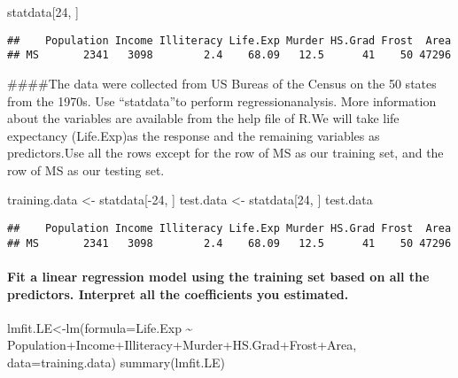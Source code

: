 \documentclass[
]{article}
\newenvironment{Shaded}{\begin{snugshade}}{\end{snugshade}}
\newcommand{\AttributeTok}[1]{\textcolor[rgb]{0.77,0.63,0.00}{#1}}
\newcommand{\DecValTok}[1]{\textcolor[rgb]{0.00,0.00,0.81}{#1}}
\newcommand{\FunctionTok}[1]{\textcolor[rgb]{0.00,0.00,0.00}{#1}}
\newcommand{\NormalTok}[1]{#1}
\newcommand{\OtherTok}[1]{\textcolor[rgb]{0.56,0.35,0.01}{#1}}
\newcommand{\SpecialCharTok}[1]{\textcolor[rgb]{0.00,0.00,0.00}{#1}}
\begin{document}
\begin{Shaded}
\begin{Highlighting}[]
\NormalTok{statdata[}\DecValTok{24}\NormalTok{, ]}
\end{Highlighting}
\end{Shaded}

\begin{verbatim}
##    Population Income Illiteracy Life.Exp Murder HS.Grad Frost  Area
## MS       2341   3098        2.4    68.09   12.5      41    50 47296
\end{verbatim}

\#\#\#\#The data were collected from US Bureas of the Census on the 50
states from the 1970s. Use ``statdata''to perform regressionanalysis.
More information about the variables are available from the help file of
R.We will take life expectancy (Life.Exp)as the response and the
remaining variables as predictors.Use all the rows except for the row of
MS as our training set, and the row of MS as our testing set.

\begin{Shaded}
\begin{Highlighting}[]
\NormalTok{training.data }\OtherTok{\textless{}{-}}\NormalTok{ statdata[}\SpecialCharTok{{-}}\DecValTok{24}\NormalTok{, ]}
\NormalTok{test.data }\OtherTok{\textless{}{-}}\NormalTok{ statdata[}\DecValTok{24}\NormalTok{, ]}
\NormalTok{test.data}
\end{Highlighting}
\end{Shaded}

\begin{verbatim}
##    Population Income Illiteracy Life.Exp Murder HS.Grad Frost  Area
## MS       2341   3098        2.4    68.09   12.5      41    50 47296
\end{verbatim}

\hypertarget{fit-a-linear-regression-model-using-the-training-set-based-on-all-the-predictors.-interpret-all-the-coefficients-you-estimated.}{%
\paragraph{Fit a linear regression model using the training set based on
all the predictors. Interpret all the coefficients you
estimated.}\label{fit-a-linear-regression-model-using-the-training-set-based-on-all-the-predictors.-interpret-all-the-coefficients-you-estimated.}}

\begin{Shaded}
\begin{Highlighting}[]
\NormalTok{lmfit.LE}\OtherTok{\textless{}{-}}\FunctionTok{lm}\NormalTok{(}\AttributeTok{formula=}\NormalTok{Life.Exp }\SpecialCharTok{\textasciitilde{}}\NormalTok{ Population}\SpecialCharTok{+}\NormalTok{Income}\SpecialCharTok{+}\NormalTok{Illiteracy}\SpecialCharTok{+}\NormalTok{Murder}\SpecialCharTok{+}\NormalTok{HS.Grad}\SpecialCharTok{+}\NormalTok{Frost}\SpecialCharTok{+}\NormalTok{Area, }\AttributeTok{data=}\NormalTok{training.data)}
\FunctionTok{summary}\NormalTok{(lmfit.LE)}
\end{Highlighting}
\end{Shaded}
\end{document}
